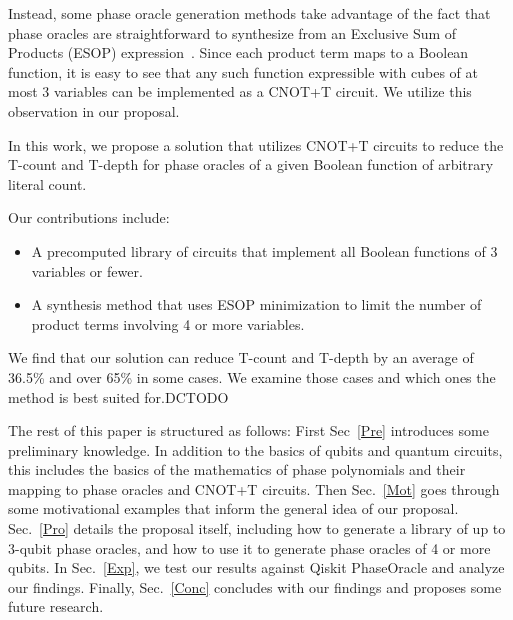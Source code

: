 Instead, some phase oracle generation methods take advantage of the fact that
phase oracles are straightforward to synthesize from an Exclusive Sum
of Products (ESOP) expression~\cite{bib-phaseoracle}. Since each product term maps to
a Boolean function, it is easy to see that any such function expressible with
cubes of at most 3 variables can be implemented as a CNOT+T circuit. We utilize
this observation in our proposal.

In this work, we propose a solution that utilizes CNOT+T circuits to reduce the
T-count and T-depth for phase oracles of a given Boolean function of arbitrary
literal count.

Our contributions include:

\begin{itemize}
\item A precomputed library of circuits that implement all Boolean functions of
  3 variables or fewer.
\item A synthesis method that uses ESOP minimization to limit the number of
  product terms involving 4 or more variables.
\end{itemize}

We find that our solution can reduce T-count and T-depth by an average of 36.5\%
and over 65\% in some cases. We examine those cases and which ones the method
is best suited for.DCTODO

The rest of this paper is structured as follows: First Sec~\ref{Pre}
introduces some preliminary knowledge. In addition to the basics of
qubits and quantum circuits, this includes the basics of the
mathematics of phase polynomials and their mapping to phase oracles
and CNOT+T circuits. Then Sec.~\ref{Mot} goes through some
motivational examples that inform the general idea of our proposal.
Sec.~\ref{Pro} details the proposal itself, including how to
generate a library of up to 3-qubit phase oracles, and how to use
it to generate phase oracles of 4 or more qubits. In Sec.~\ref{Exp},
we test our results against Qiskit PhaseOracle and analyze our
findings. Finally, Sec.~\ref{Conc} concludes with our findings and
proposes some future research.

